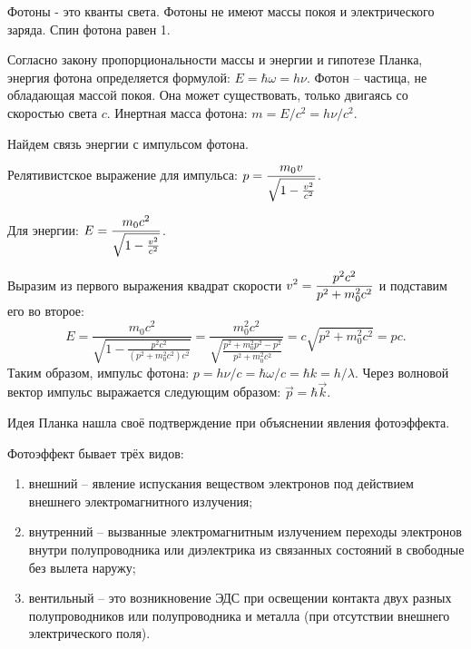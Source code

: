 
Фотоны - это кванты света. Фотоны не имеют массы покоя и электрического заряда.
Спин фотона равен 1.

Согласно закону пропорциональности массы и энергии и гипотезе Планка, энергия
фотона определяется формулой: \( E = \hbar\omega = h\nu \). Фотон -- частица, не
обладающая массой покоя. Она может существовать, только двигаясь со скоростью
света \( c \). Инертная масса фотона: \( m = E/c^2 = h\nu/c^2 \).

Найдем связь энергии с импульсом фотона.

Релятивистское выражение для импульса: \( \displaystyle p = \frac{m_0v}{\sqrt{1 -
\frac{v^2}{c^2}}} \).

Для энергии: \( \displaystyle E = \frac{m_0c^2}{\sqrt{1 - \frac{v^2}{c^2}}} \).

Выразим из первого выражения квадрат скорости \( \displaystyle v^2 = \frac{p^2c^2}{p^2 +
m_0^2c^2} \) и подставим его во второе:
\[
    E = \frac{m_0c^2}{\sqrt{1 - \frac{p^2c^2}{(p^2 + m_0^2c^2)c^2}}} =
    \frac{m_0^2c^2}{\sqrt{\frac{p^2 + m_0^2p^2 - p^2}{p^2 + m_0^2c^2}}} =
    c\sqrt{p^2 + m_0^2c^2} = pc.
\]
Таким образом, импульс фотона: \( p = h\nu/c = \hbar\omega/c = \hbar k =
h/\lambda \). Через волновой вектор импульс выражается следующим образом:
\( \vec{p} = \hbar\vec{k} \).

Идея Планка нашла своё подтверждение при объяснении явления фотоэффекта.

Фотоэффект бывает трёх видов:
\begin{enumerate}
    \item внешний -- явление испускания веществом электронов под действием
    внешнего электромагнитного излучения;
    \item внутренний -- вызванные электромагнитным излучением переходы
    электронов внутри полупроводника или диэлектрика из связанных состояний в
    свободные без вылета наружу;
    \item вентильный -- это возникновение ЭДС при освещении контакта двух разных
    полупроводников или полупроводника и металла (при отсутствии внешнего
    электрического поля).
\end{enumerate}

